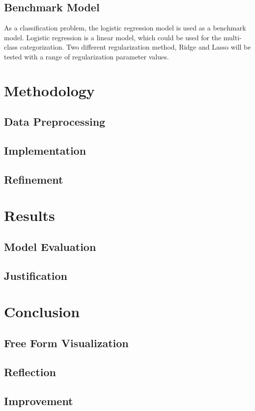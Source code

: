 \documentclass[12pt]{article}
\begin{document}
\subsection{Benchmark Model}
As a classification problem, the logistic regression model is used as a benchmark model. Logistic regression is a linear model, which could be used for the multi-class categorization. Two different regularization method, Ridge and Lasso will be tested with a range of regularization parameter values.
\section{Methodology}
\subsection{Data Preprocessing}
\subsection{Implementation}
\subsection{Refinement}

\section{Results}
\subsection{Model Evaluation}
\subsection{Justification}

\section{Conclusion}
\subsection{Free Form Visualization}
\subsection{Reflection}
\subsection{Improvement}
\end{document}
